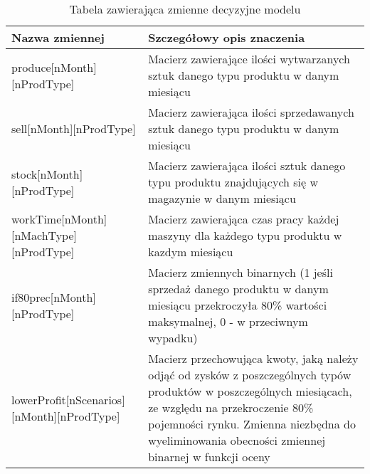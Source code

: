 \documentclass[11pt,a4paper]{article}
\begin{document}
\begin{table}[ht!]
\caption{Tabela zawierająca zmienne decyzyjne modelu}
\label{tab:var}
\begin{tabular}{lp{7.5cm}}
	\hline
    Nazwa zmiennej      & Szczegółowy opis znaczenia \\
        \hline
        produce[nMonth][nProdType] & Macierz zawierające ilości wytwarzanych sztuk danego typu produktu w danym miesiącu \\
        sell[nMonth][nProdType] & Macierz zawierająca ilości sprzedawanych sztuk danego typu produktu w danym miesiącu \\
        stock[nMonth][nProdType] & Macierz zawierająca ilości sztuk danego typu produktu znajdujących się w magazynie w danym miesiącu \\
        workTime[nMonth][nMachType][nProdType] & Macierz zawierająca czas pracy każdej maszyny dla każdego typu produktu w kazdym miesiącu \\
        if80prec[nMonth][nProdType] & Macierz zmiennych binarnych (1 jeśli sprzedaż danego produktu w danym miesiącu przekroczyła 80\% wartości maksymalnej, 0 - w przeciwnym wypadku)\\
        lowerProfit[nScenarios][nMonth][nProdType] & Macierz przechowująca kwoty, jaką należy odjąć od zysków z poszczególnych typów produktów w poszczególnych miesiącach, ze względu na przekroczenie 80\% pojemności rynku. Zmienna niezbędna do wyeliminowania obecności zmiennej binarnej w funkcji oceny\\
	\hline
\end{tabular}
\end{table}
\end{document}
